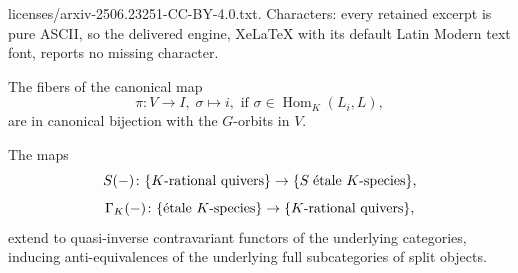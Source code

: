 \documentclass[10pt,a4paper]{amsart}
\DeclareMathOperator{\Hom}{\mathrm{Hom}}
\begin{document}
licenses/arxiv-2506.23251-CC-BY-4.0.txt. Characters: every retained excerpt is pure ASCII, so the delivered engine, XeLaTeX with its default Latin Modern text font, reports no missing character.
  \begin{proposition}\label{prop:Viorbits}
  The fibers of the canonical map
  \[
  \pi\colon V\to I,\;\sigma\mapsto i,\text{ if }\sigma\in\Hom_K(L_i,L),
  \]
  are in canonical bijection with the $G$-orbits in $V$.
  \end{proposition}

  \begin{theorem}\label{thm:KrationalquiveretaleKspeciesantiequivalence}
    The maps
    \[
    S(-)\colon \{\text{\rm $K$-rational quivers}\}\to\{S\;\text{\rm \'etale $K$-species}\},
    \]
    \[
    \Gamma_K(-)\colon \{\text{\rm \'etale $K$-species}\}\to\{\text{\rm $K$-rational quivers}\},
    \]
    extend to quasi-inverse contravariant functors of the underlying categories, inducing anti-equivalences of the underlying full subcategories of split objects.
  \end{theorem}
\end{document}
